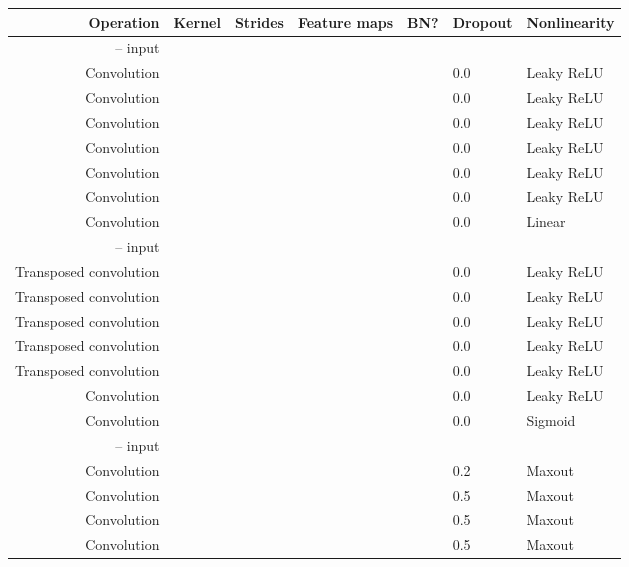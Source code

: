 \documentclass{article}
\begin{document}
\begin{table}[h]
\centering
\begin{tabular}{@{}rllllll@{}} \toprule
Operation              & Kernel       & Strides      & Feature maps & BN?      & Dropout & Nonlinearity \\ \midrule
 --  input                                                             \\
Convolution            &  &  &          &   & 0.0     & Leaky ReLU \\
Convolution            &  &  &          &   & 0.0     & Leaky ReLU \\
Convolution            &  &  &         &   & 0.0     & Leaky ReLU \\
Convolution            &  &  &         &   & 0.0     & Leaky ReLU \\
Convolution            &  &  &         &   & 0.0     & Leaky ReLU \\
Convolution            &  &  &         &   & 0.0     & Leaky ReLU \\
Convolution            &  &  &         &  & 0.0     & Linear     \\
 --  input                                                              \\
Transposed convolution &  &  &         &   & 0.0     & Leaky ReLU \\
Transposed convolution &  &  &         &   & 0.0     & Leaky ReLU \\
Transposed convolution &  &  &          &   & 0.0     & Leaky ReLU \\
Transposed convolution &  &  &          &   & 0.0     & Leaky ReLU \\
Transposed convolution &  &  &          &   & 0.0     & Leaky ReLU \\
Convolution            &  &  &          &   & 0.0     & Leaky ReLU \\
Convolution            &  &  &           &  & 0.0     & Sigmoid    \\
 --  input                                                               \\
Convolution            &  &  &          &  & 0.2     & Maxout     \\
Convolution            &  &  &          &  & 0.5     & Maxout     \\
Convolution            &  &  &         &  & 0.5     & Maxout     \\
Convolution            &  &  &         &  & 0.5     & Maxout     \\

\end{tabular}
\end{table}
\end{document}
